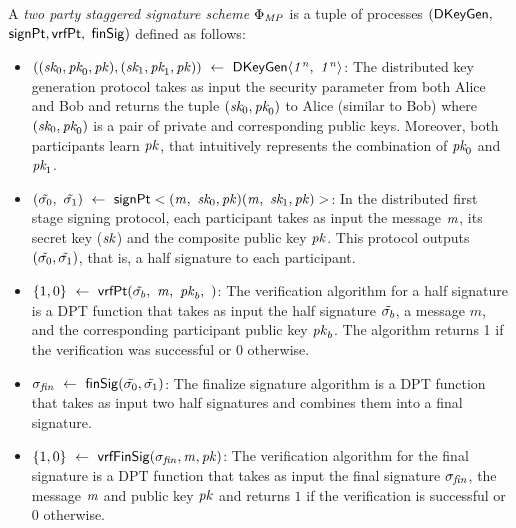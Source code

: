 \begin{definition}
\label{def:two-party-scheme}	
A \emph{two party staggered signature scheme $\Phi_{\mathit{MP}}$} is a tuple of processes $(\mathsf{DKeyGen},$  $\mathsf{signPt}, \mathsf{vrfPt},$ $\mathsf{finSig})$ defined as follows: 
    
    \begin{itemize}
    	\item $((\textit{sk}_0, \textit{pk}_0, \mathit{pk}), (\textit{sk}_1, \textit{pk}_1, \mathit{pk} )) ~\leftarrow~ \mathsf{DKeyGen}\langle \mathit{1^n} ,~ \mathit{1^n} \rangle$: The distributed key generation protocol takes as input the security parameter from both Alice and Bob and returns the tuple $(\textit{sk}_0, \textit{pk}_0)$ to Alice (similar to Bob) where $(\textit{sk}_0, \textit{pk}_0)$ is a pair of private and corresponding public keys. Moreover, both participants learn $\mathit{pk}$, that intuitively represents the combination of $\textit{pk}_0$ and $\textit{pk}_1$. 
    	
    	\item $(\tilde{\sigma_0} ,~ \tilde{\sigma_1}) ~\leftarrow~ \mathsf{signPt}<(\mathit{m} ,~ \textit{sk}_0, \mathit{pk})(\mathit{m} ,~ \textit{sk}_1, \mathit{pk})>$: In the distributed first stage signing protocol, each participant takes as input the message $\mathit{m}$, its secret key ($\mathit{sk}$) and the composite public key $\mathit{pk}$. This protocol outputs $(\tilde{\sigma_0}, \tilde{\sigma_1})$, that is, a half signature to each participant.  
    	
    	\item $\{1,0\} ~\leftarrow~ \mathsf{vrfPt}(\tilde{\sigma_b} ,~ \mathit{m} ,~ \mathit{pk}_b ,~ )$:  The verification algorithm for a half signature is a DPT function that takes as input the half signature $\tilde{\sigma_b}$, a message $m$, and the corresponding participant public key $\mathit{pk}_b$. The algorithm returns 1 if the verification was successful or 0 otherwise.
        \item $\sigma_{\mathit{fin}} ~\leftarrow~ \mathsf{finSig}(\tilde{\sigma_0},\tilde{\sigma_1})$: The finalize signature algorithm is a DPT function that takes as input two half  signatures and combines them into a final signature.
        
        \item $\{1,0\} ~\leftarrow~ \mathsf{vrfFinSig}(\sigma_{\mathit{fin}}, \mathit{m}, \mathit{pk}) $: The verification algorithm for the final signature is a DPT function that takes as input the final signature $\sigma_{\mathit{fin}}$, the message $\mathit{m}$ and public key $\mathit{pk}$ and returns $1$ if the verification is successful or $0$ otherwise.  
    \end{itemize}
\end{definition}


